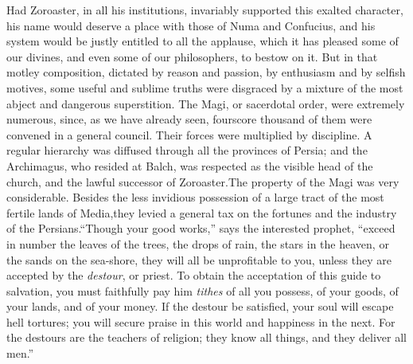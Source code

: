 Had Zoroaster, in all his institutions, invariably supported this
exalted character, his name would deserve a place with those of
Numa and Confucius, and his system would be justly entitled to
all the applause, which it has pleased some of our divines, and
even some of our philosophers, to bestow on it. But in that
motley composition, dictated by reason and passion, by enthusiasm
and by selfish motives, some useful and sublime truths were
disgraced by a mixture of the most abject and dangerous
superstition. The Magi, or sacerdotal order, were extremely
numerous, since, as we have already seen, fourscore thousand of
them were convened in a general council. Their forces were
multiplied by discipline. A regular hierarchy was diffused
through all the provinces of Persia; and the Archimagus, who
resided at Balch, was respected as the visible head of the
church, and the lawful successor of Zoroaster.\footnotemark[17] The property of
the Magi was very considerable. Besides the less invidious
possession of a large tract of the most fertile lands of Media,\footnotemark[18]
they levied a general tax on the fortunes and the industry of
the Persians.\footnotemark[19] “Though your good works,” says the interested
prophet, “exceed in number the leaves of the trees, the drops of
rain, the stars in the heaven, or the sands on the sea-shore,
they will all be unprofitable to you, unless they are accepted by
the \textit{destour}, or priest. To obtain the acceptation of this guide
to salvation, you must faithfully pay him \textit{tithes} of all you
possess, of your goods, of your lands, and of your money. If the
destour be satisfied, your soul will escape hell tortures; you
will secure praise in this world and happiness in the next. For
the destours are the teachers of religion; they know all things,
and they deliver all men.”\footnotemark[20] \footnotemark[201]




